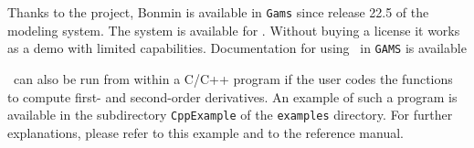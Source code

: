 Thanks to the  project, 
Bonmin is available in {\tt Gams} since release 22.5 of the  modeling system. 
The system is available for . Without buying a license it works as a demo with limited capabilities. Documentation for using \Bonmin\ in {\tt GAMS} is available


\Bonmin\ can also be run from within a C/C++ program if the user codes
the functions to compute first- and second-order derivatives.
An example of such a program is available in the subdirectory {\tt CppExample} of
the {\tt examples} directory. For further explanations, please refer to this example and to the reference manual.
